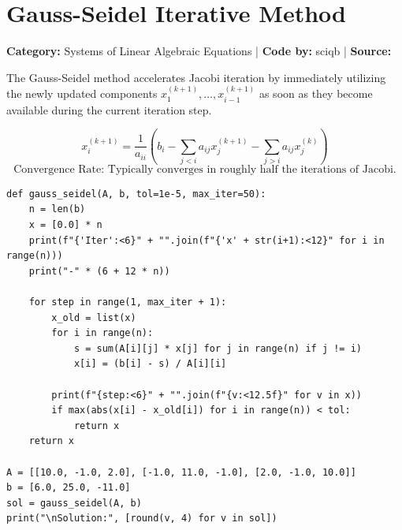 \documentclass[10pt,a4paper]{report}
\begin{document}
\newpage


\section{Gauss-Seidel Iterative Method}
\textbf{Category:} \textcolor{secondary}{Systems of Linear Algebraic Equations} \quad | \quad \textbf{Code by:} \textcolor{secondary}{sciqb} \quad | \quad \textbf{Source:} \texttt{}

The Gauss-Seidel method accelerates Jacobi iteration by immediately utilizing the newly updated components $x_1^{(k+1)}, \dots, x_{i-1}^{(k+1)}$ as soon as they become available during the current iteration step.

\begin{tcolorbox}[colback=theorybg,colframe=theoryframe,title=\textbf{Mathematical Theory \& Formulation},boxrule=1pt,arc=2mm]
\[
x_i^{(k+1)} = \frac{1}{a_{ii}}\left(b_i - \sum_{j < i} a_{ij} x_j^{(k+1)} - \sum_{j > i} a_{ij} x_j^{(k)}\right)
\]
\[
\text{Convergence Rate: Typically converges in roughly half the iterations of Jacobi.}
\]
\end{tcolorbox}

\begin{tcolorbox}[colback=codebg,colframe=secondary,title=\textbf{Python Implementation (Step-by-Step Functions)},boxrule=1pt,arc=2mm]
\begin{lstlisting}[style=python_detailed]
def gauss_seidel(A, b, tol=1e-5, max_iter=50):
    n = len(b)
    x = [0.0] * n
    print(f"{'Iter':<6}" + "".join(f"{'x' + str(i+1):<12}" for i in range(n)))
    print("-" * (6 + 12 * n))

    for step in range(1, max_iter + 1):
        x_old = list(x)
        for i in range(n):
            s = sum(A[i][j] * x[j] for j in range(n) if j != i)
            x[i] = (b[i] - s) / A[i][i]

        print(f"{step:<6}" + "".join(f"{v:<12.5f}" for v in x))
        if max(abs(x[i] - x_old[i]) for i in range(n)) < tol:
            return x
    return x

A = [[10.0, -1.0, 2.0], [-1.0, 11.0, -1.0], [2.0, -1.0, 10.0]]
b = [6.0, 25.0, -11.0]
sol = gauss_seidel(A, b)
print("\nSolution:", [round(v, 4) for v in sol])


\end{lstlisting}
\end{tcolorbox}
\end{document}
